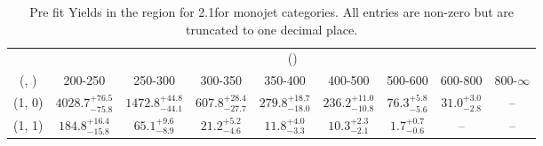 \begin{table}[h!]
\tiny
\centering
\caption{Pre fit Yields in the \mj region for 2.1\ifb for monojet categories. All entries are non-zero but are truncated to one decimal place.\label{tab:prednodatanaive_mu_comb_mono}}
\begin{tabular}
{ccccccccc}
	\hline\hline
	& \multicolumn{8}{c}{\scalht (\gev)} \\ 
	 (\njet,  \nb) & 200-250 & 250-300 & 300-350 & 350-400 & 400-500 & 500-600 & 600-800 & 800-$\infty$ \\ [0.8ex] 
\hline
	(1, 0) & $4028.7^{+ 76.5 }_{- 75.8 }$ & $1472.8^{+ 44.8 }_{- 44.1 }$ & $607.8^{+ 28.4 }_{- 27.7 }$ & $279.8^{+ 18.7 }_{- 18.0 }$ & $236.2^{+ 11.0 }_{- 10.8 }$ & $76.3^{+ 5.8 }_{- 5.6 }$ & $31.0^{+ 3.0 }_{- 2.8 }$ & -- \\[0.5ex] 
	(1, 1) & $184.8^{+ 16.4 }_{- 15.8 }$ & $65.1^{+ 9.6 }_{- 8.9 }$ & $21.2^{+ 5.2 }_{- 4.6 }$ & $11.8^{+ 4.0 }_{- 3.3 }$ & $10.3^{+ 2.3 }_{- 2.1 }$ & $1.7^{+ 0.7 }_{- 0.6 }$ & -- & -- \\[0.5ex] 
	\hline
	\hline
\end{tabular}
\end{table}
